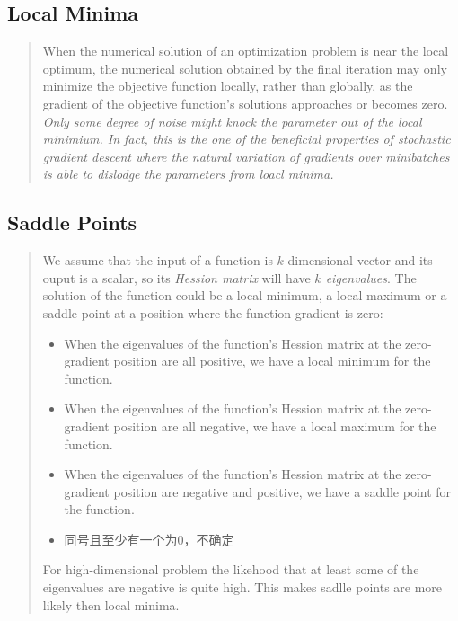 \subsection{Local Minima}
\begin{quotation}
    When the numerical solution of an optimization problem is near the local optimum, the numerical
    solution obtained by the final iteration may only minimize the objective function locally, rather
    than globally, as the gradient of the objective function's solutions approaches or becomes zero.
    \textit{Only some degree of noise might knock the parameter out of the local minimium. In fact,
        this is the one of the beneficial properties of stochastic gradient descent where the natural variation
        of gradients over minibatches is able to dislodge the parameters from loacl minima.}\cite{zhang2020dive}
\end{quotation}
\subsection{Saddle Points}
\begin{quotation}
    We assume that the input of a function is $k$-dimensional vector and its ouput is a scalar,
    so its \textit{Hession matrix} will have \textit{$k$ eigenvalues}. The solution of the function could
    be a local minimum, a local maximum or a saddle point at a position where the function gradient
    is zero:
    \begin{itemize}
        \item When the eigenvalues of the function's Hession matrix at the zero-gradient position 
        are all positive, we have a local minimum for the function.
        \item When the eigenvalues of the function's Hession matrix at the zero-gradient position 
        are all negative, we have a local maximum for the function.
        \item When the eigenvalues of the function's Hession matrix at the zero-gradient position 
        are negative and positive, we have a saddle point for the function.
        \item 同号且至少有一个为0，不确定
    \end{itemize}
    For high-dimensional problem the likehood that at least some of the eigenvalues are negative
    is quite high. This makes sadlle points are more likely then local minima.\cite{zhang2020dive}
\end{quotation}

